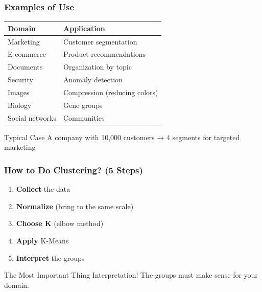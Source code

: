 \documentclass{beamer}
\begin{document}
\begin{frame}
\frametitle{Examples of Use}
\begin{table}
\centering
\small
\begin{tabular}{ll}
\toprule
\textbf{Domain} & \textbf{Application} \\
\midrule
Marketing & Customer segmentation \\
E-commerce & Product recommendations \\
Documents & Organization by topic \\
Security & Anomaly detection \\
Images & Compression (reducing colors) \\
Biology & Gene groups \\
Social networks & Communities \\
\bottomrule
\end{tabular}
\end{table}

\vspace{1em}
\begin{exampleblock}{Typical Case}
A company with 10,000 customers → 4 segments for targeted marketing
\end{exampleblock}
\end{frame}


\begin{frame}
\frametitle{How to Do Clustering? (5 Steps)}
\begin{enumerate}
    \item \textbf{Collect} the data
    \vspace{0.5em}
    
    \item \textbf{Normalize} (bring to the same scale)
    \vspace{0.5em}
    
    \item \textbf{Choose K} (elbow method)
    \vspace{0.5em}
    
    \item \textbf{Apply} K-Means
    \vspace{0.5em}
    
    \item \textbf{Interpret} the groups
\end{enumerate}

\vspace{1em}
\begin{alertblock}{The Most Important Thing}
Interpretation! The groups must make sense for your domain.
\end{alertblock}
\end{frame}
\end{document}

